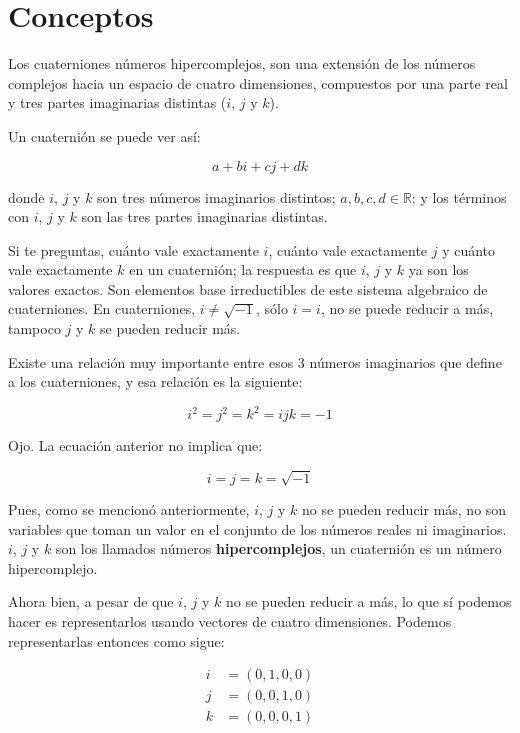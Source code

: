 \section{Conceptos}

Los cuaterniones números hipercomplejos, son una extensión de los números complejos hacia un espacio de cuatro dimensiones, compuestos por una parte real y tres partes imaginarias distintas ($i$, $j$ y $k$).

Un cuaternión se puede ver así:

\begin{equation}
    a + bi + cj + dk
\end{equation}

donde $i$, $j$ y $k$ son tres números imaginarios distintos; $a,b,c,d\in\mathbb{R}$; y los términos con $i$, $j$ y $k$ son las tres partes imaginarias distintas.

Si te preguntas, cuánto vale exactamente $i$, cuánto vale exactamente $j$ y cuánto vale exactamente $k$ en un cuaternión; la respuesta es que $i$, $j$ y $k$ ya son los valores exactos. Son elementos base irreductibles de este sistema algebraico de cuaterniones. En cuaterniones, $i\neq\sqrt{-1}$, sólo $i=i$, no se puede reducir a más, tampoco $j$ y $k$ se pueden reducir más. 

Existe una relación muy importante entre esos 3 números imaginarios que define a los cuaterniones, y esa relación es la siguiente:

\begin{equation}
    i^{2}=j^{2}=k^{2}=ijk=-1
\end{equation}

Ojo. La ecuación anterior no implica que:

\begin{equation}
    i=j=k=\sqrt{-1}
\end{equation}

Pues, como se mencionó anteriormente, $i$, $j$ y $k$ no se pueden reducir más, no son variables que toman un valor en el conjunto de los números reales ni imaginarios. $i$, $j$ y $k$ son los llamados números \textbf{hipercomplejos}, un cuaternión es un número hipercomplejo. 

Ahora bien, a pesar de que $i$, $j$ y $k$ no se pueden reducir a más, lo que sí podemos hacer es representarlos usando vectores de cuatro dimensiones. Podemos representarlas entonces como sigue:

\begin{align}
    i &= (0,1,0,0) \\
    j &= (0,0,1,0) \\
    k &= (0,0,0,1)
\end{align}

